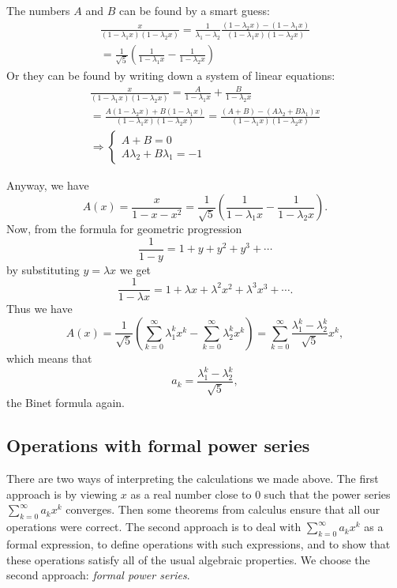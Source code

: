 \begin{page}
The numbers $A$ and $B$ can be found by a smart guess:
\begin{multline*}
\frac{x}{(1-\lambda_1x)(1-\lambda_2x)} =
\frac{1}{\lambda_1 - \lambda_2} \frac{(1-\lambda_2x) - (1-\lambda_1x)}{(1-\lambda_1x)(1-\lambda_2x)}\\
= \frac{1}{\sqrt{5}} \left( \frac{1}{1-\lambda_1x} - \frac{1}{1-\lambda_2x} \right)
\end{multline*}
Or they can be found by writing down a system of linear equations:
\begin{multline*}
\frac{x}{(1-\lambda_1x)(1-\lambda_2x)} = \frac{A}{1-\lambda_1x} + \frac{B}{1-\lambda_2x}\\
= \frac{A(1-\lambda_2x) + B(1-\lambda_1x)}{(1-\lambda_1x)(1-\lambda_2x)}
= \frac{(A+B) - (A\lambda_2 + B\lambda_1)x}{(1-\lambda_1x)(1-\lambda_2x)}\\
\Rightarrow \begin{cases} A+B = 0\\ A\lambda_2 + B\lambda_1 = -1 \end{cases}
\end{multline*}

Anyway, we have
\[
A(x) = \frac{x}{1-x-x^2} = \frac{1}{\sqrt{5}} \left( \frac{1}{1-\lambda_1x} - \frac{1}{1-\lambda_2x} \right).
\]
Now, from the formula for geometric progression
\[
\frac{1}{1-y} = 1 + y + y^2 + y^3 + \cdots
\]
by substituting $y = \lambda x$ we get
\[
\frac{1}{1 - \lambda x} = 1 + \lambda x + \lambda^2 x^2 + \lambda^3 x^3 + \cdots.
\]
Thus we have
\[
A(x) = \frac{1}{\sqrt{5}} \left( \sum_{k=0}^\infty \lambda_1^kx^k - \sum_{k=0}^\infty \lambda_2^kx^k \right)
= \sum_{k=0}^\infty \frac{\lambda_1^k - \lambda_2^k}{\sqrt{5}} x^k,
\]
which means that
\[
a_k = \frac{\lambda_1^k - \lambda_2^k}{\sqrt{5}},
\]
the Binet formula again.



\end{page}

\begin{page}
\setcounter{section}{2}
\setcounter{subsection}{2}
\setcounter{dfn}{0}
\label{portion:725}

\subsection{Operations with formal power series}
\label{sec:OperFPS}
There are two ways of interpreting the calculations we made above.
The first approach is by viewing $x$ as a real number close to $0$ such that the power series $\sum_{k=0}^\infty a_k x^k$ converges.
Then some theorems from calculus ensure that all our operations were correct.
The second approach is to deal with $\sum_{k=0}^\infty a_k x^k$ as a formal expression,
to define operations with such expressions, and to show that these operations satisfy all of the usual algebraic properties.
We choose the second approach: \emph{formal power series}.


\end{page}

